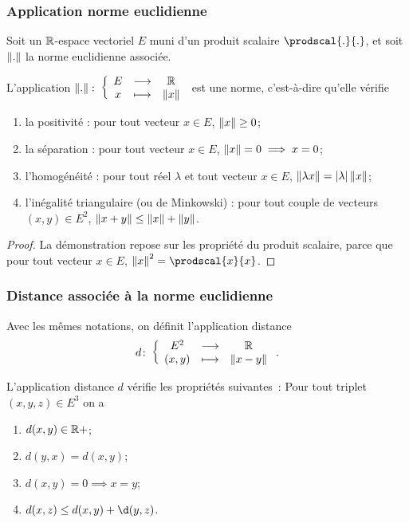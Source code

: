 \subsubsection{Application norme euclidienne}

Soit un $\mathbb{R}$-espace vectoriel $E$ muni d'un produit scalaire $\prodscal{.}{.}$, et soit $\left\lVert.\right\rVert$ la norme euclidienne associée.

\begin{prop}
  L'application $\left\lVert.\right\rVert\colon \left\{\begin{array}{ccc} E & \longrightarrow &\mathbb{R}\\ x & \longmapsto & \left\lVert x\right\rVert \end{array} \right.$ est une norme, c'est-à-dire qu'elle vérifie
  \begin{enumerate}
  \item la positivité : pour tout vecteur $x \in E$, $\left\lVert x\right\rVert \geq 0$;
  \item la séparation : pour tout vecteur $x \in E$, $\left\lVert x\right\rVert= 0 \implies x=0$;
  \item l'homogénéité : pour tout réel $\lambda$ et tout vecteur $x \in E$, $\left\lVert\lambda x\right\rVert=\left\lvert\lambda\right\rvert\left\lVert x\right\rVert$;
  \item l'inégalité triangulaire (ou de Minkowski) : pour tout couple de vecteurs $(x,y) \in E^2$, $\left\lVert x+y\right\rVert\leq \left\lVert x\right\rVert+\left\lVert y\right\rVert$.
  \end{enumerate}
\end{prop}
\begin{proof}
  La démonstration repose sur les propriété du produit scalaire, parce que pour tout vecteur $x \in E$, $\norme{x}^2 = \prodscal{x}{x}$.
\end{proof}

\subsubsection{Distance associée à la norme euclidienne}

Avec les mêmes notations, on définit l'application distance
\begin{equation}
  d\colon \left\{\begin{array}{ccc} E^2 & \longrightarrow &\mathbb{R}\\ (x,y) & \longmapsto & \left\lVert x-y\right\rVert \end{array} \right..
\end{equation}
% 
\begin{prop}
  L'application distance $d$ vérifie les propriétés suivantes~: Pour tout triplet $(x,y,z) \in E^3$ on a
  \begin{enumerate}
  \item $d(x,y) \in \mathbb{R}+$;
  \item $d(y,x)=d(x,y)$;
  \item $d(x,y)=0 \implies x=y$;
  \item $d(x,z)\leq d(x,y)+\d(y,z)$.
  \end{enumerate}
\end{prop}

